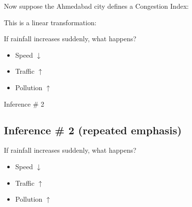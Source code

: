 \documentclass[12pt]{article}
\begin{document}
Now suppose the Ahmedabad city defines a Congestion Index:

This is a linear transformation:

If rainfall increases suddenly, what happens?

\begin{itemize}
    \item Speed $\downarrow$
    \item Traffic $\uparrow$
    \item Pollution $\uparrow$
\end{itemize}

Inference \# 2

\subsection*{Inference \# 2 (repeated emphasis)}

If rainfall increases suddenly, what happens?

\begin{itemize}
    \item Speed $\downarrow$
    \item Traffic $\uparrow$
    \item Pollution $\uparrow$
\end{itemize}
\end{document}
